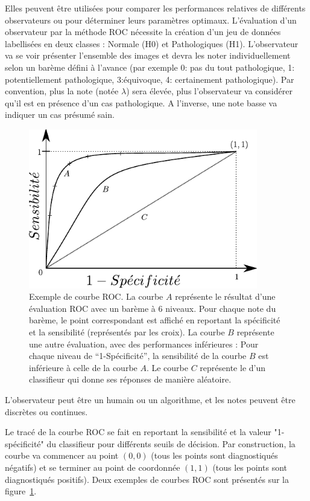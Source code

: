 Elles peuvent être utilisées pour comparer les performances relatives de différents observateurs ou pour déterminer leurs paramètres optimaux. L’évaluation d'un observateur par la méthode ROC nécessite la création d'un jeu de données labellisées en deux classes : Normale (H0) et Pathologiques (H1). L'observateur va se voir présenter l'ensemble des images et devra les noter individuellement selon un barème défini à l'avance (par exemple 0: pas du tout pathologique, 1: potentiellement pathologique, 3:équivoque, 4: certainement pathologique). Par convention, plus la note (notée $\lambda$) sera élevée, plus l'observateur va considérer qu'il est en présence d'un cas pathologique. A l'inverse, une note basse va indiquer un cas présumé sain. 


\begin{figure}[h]
	\label{fig:illustrationROC}
	\begin{center}
	\includegraphics[width=10cm]{images/illustrationROC}
	\end{center}
	\caption{Exemple de courbe ROC. La courbe $A$ représente le résultat d'une évaluation ROC avec un barème à 6 niveaux. Pour chaque note du barème, le point correspondant est affiché en reportant la spécificité et la sensibilité (représentés par les croix). La courbe $B$ représente une autre évaluation, avec des performances inférieures : Pour chaque niveau de ``1-Spécificité'', la sensibilité de la courbe $B$ est inférieure à celle de la courbe $A$. Le courbe $C$ représente le d'un classifieur qui donne ses réponses de manière aléatoire.}
\end{figure}

L'observateur peut être un humain ou un algorithme, et les notes peuvent être discrètes ou continues. 

Le tracé de la courbe ROC se fait en reportant la sensibilité et la valeur "1-spécificité" du classifieur pour différents seuils de décision. Par construction, la courbe va commencer au point $(0,0)$ (tous les points sont diagnostiqués négatifs) et se terminer au point de coordonnée $(1,1)$ (tous les points sont diagnostiqués positifs). Deux exemples de courbes ROC sont présentés sur la figure~\ref{fig:illustrationROC}.



